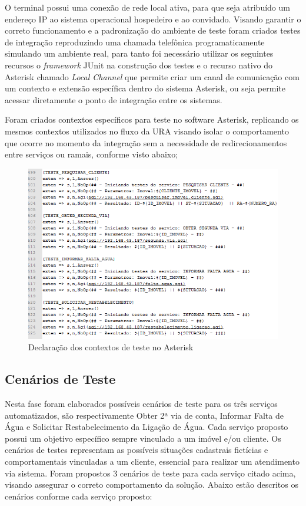 O terminal possui uma conexão de rede local ativa, para que seja atribuído um endereço IP ao sistema operacional hospedeiro e ao convidado.
Visando garantir o correto funcionamento e a padronização do ambiente de teste foram criados testes de integração reproduzindo uma chamada telefônica programaticamente simulando um ambiente real, para tanto foi necessário utilizar os seguintes recursos o \textit{framework} JUnit na construção dos testes e o recurso nativo do Asterisk chamado \textit{Local Channel} que permite criar um canal de comunicação com um contexto e extensão específica dentro do sistema Asterisk, ou seja permite acessar diretamente o ponto de integração entre os sistemas.

Foram criados contextos específicos para teste no software Asterisk, replicando os mesmos contextos utilizados no fluxo da URA visando 
isolar o comportamento que ocorre no momento da integração sem a necessidade de redirecionamentos entre serviços ou ramais, conforme visto abaixo;

\begin{figure}[H]
	\centering
	\caption{Declaração dos contextos de teste no Asterisk}
	\label{figura:contextoTeste}
	\includegraphics{figuras/contexto_teste.png}
\end{figure}


\subsection{Cenários de Teste}
Nesta fase foram elaborados possíveis cenários de teste para os três serviços automatizados, são respectivamente Obter 2ª via de conta, Informar Falta de Água e Solicitar Restabelecimento da Ligação de Água. Cada serviço proposto possui um objetivo específico sempre vinculado a um imóvel e/ou cliente.
Os cenários de testes representam as possíveis situações cadastrais fictícias e comportamentais vinculadas a um cliente, essencial para realizar um atendimento via sistema. Foram propostos 3 cenários de teste para cada serviço citado acima, visando assegurar o correto comportamento da solução. Abaixo estão descritos os cenários conforme cada serviço proposto:

